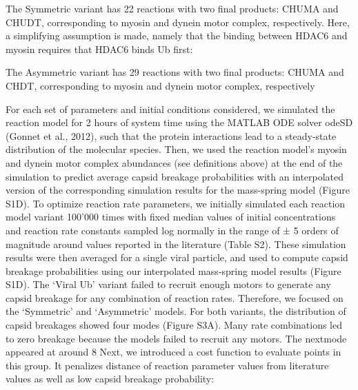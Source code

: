 The Symmetric variant has 22 reactions with two final products: CHUMA and CHUDT, corresponding to myosin and dynein motor complex, respectively. Here, a simplifying assumption is made, namely that the binding between HDAC6 and myosin requires that HDAC6 binds Ub first:
 

The Asymmetric variant has 29 reactions with two final products: CHUMA and CHDT, corresponding to myosin and dynein motor complex, respectively
 

For each set of parameters and initial conditions considered, we simulated the reaction model for 2 hours of system time using the MATLAB ODE solver odeSD (Gonnet et al., 2012), such that the protein interactions lead to a steady-state distribution of the molecular species. Then, we used the reaction model’s myosin and dynein motor complex abundances (see definitions above) at the end of the simulation to predict average capsid breakage probabilities with an interpolated version of the corresponding simulation results for the mass-spring model (Figure S1D).
To optimize reaction rate parameters, we initially simulated each reaction model variant 100’000 times with fixed median values of initial concentrations and reaction rate constants sampled log normally in the range of ± 5 orders of magnitude around values reported in the literature (Table S2). These simulation results were then averaged for a single viral particle, and used to compute capsid breakage probabilities using our interpolated mass-spring model results (Figure S1D). The ‘Viral Ub’ variant failed to recruit enough motors to generate any capsid breakage for any combination of reaction rates. Therefore, we focused on the ‘Symmetric’ and ‘Asymmetric’ models.
For both variants, the distribution of capsid breakages showed four modes (Figure S3A). Many rate combinations led to zero breakage because the models failed to recruit any motors. The nextmode appeared at around 8%
Next, we introduced a cost function to evaluate points in this group. It penalizes distance of reaction parameter values from literature values as well as low capsid breakage probability:
